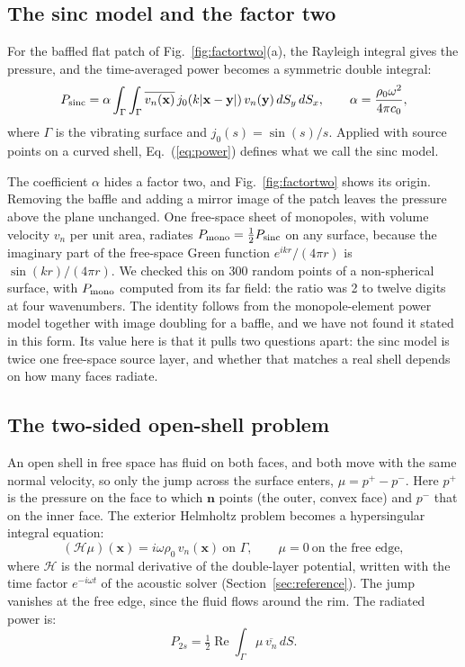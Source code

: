 \documentclass[preprint,12pt]{elsarticle}
\begin{document}
\subsection{The sinc model and the factor two}
\label{sec:sinc}
For the baffled flat patch of Fig.~\ref{fig:factortwo}(a), the Rayleigh integral gives the pressure, and the time-averaged power becomes a symmetric double integral:
\begin{equation}
 P_{\rm sinc}=\alpha\int_\Gamma\int_\Gamma \overline{v_n(\mathbf x)}\,
 j_0(k|\mathbf x-\mathbf y|)\,v_n(\mathbf y)\,dS_y\, dS_x,
 \qquad \alpha=\frac{\rho_0\omega^2}{4\pi c_0},
 \label{eq:power}
\end{equation}
where $\Gamma$ is the vibrating surface and $j_0(s)=\sin(s)/s$. Applied with source points on a curved shell, Eq.~(\ref{eq:power}) defines what we call the sinc model.

The coefficient $\alpha$ hides a factor two, and Fig.~\ref{fig:factortwo} shows its origin. Removing the baffle and adding a mirror image of the patch leaves the pressure above the plane unchanged. One free-space sheet of monopoles, with volume velocity $v_n$ per unit area, radiates $P_{\rm mono}=\tfrac12P_{\rm sinc}$ on any surface, because the imaginary part of the free-space Green function $e^{ikr}/(4\pi r)$ is $\sin(kr)/(4\pi r)$. We checked this on 300 random points of a non-spherical surface, with $P_{\rm mono}$ computed from its far field: the ratio was 2 to twelve digits at four wavenumbers. %
The identity follows from the monopole-element power model \cite{FahnlineKoopmann1996} together with image doubling for a baffle, and we have not found it stated in this form. Its value here is that it pulls two questions apart: the sinc model is twice one free-space source layer, and whether that matches a real shell depends on how many faces radiate.

\subsection{The two-sided open-shell problem}
\label{sec:twosided}
An open shell in free space has fluid on both faces, and both move with the same normal velocity, so only the jump across the surface enters, $\mu=p^+-p^-$. Here $p^+$ is the pressure on the face to which $\mathbf n$ points (the outer, convex face) and $p^-$ that on the inner face. The exterior Helmholtz problem becomes a hypersingular integral equation:
\begin{equation}
 (\mathcal H\mu)(\mathbf x)=i\omega\rho_0\,v_n(\mathbf x)\ \text{on }\Gamma,\qquad \mu=0\ \text{on the free edge},
 \label{eq:hypersingular}
\end{equation}
where $\mathcal H$ is the normal derivative of the double-layer potential, written with the time factor $e^{-i\omega t}$ of the acoustic solver (Section~\ref{sec:reference}). The jump vanishes at the free edge, since the fluid flows around the rim. The radiated power is:
\begin{equation}
 P_{2s}=\tfrac12\operatorname{Re}\int_\Gamma \mu\,\overline{v_n}\,dS .
 \label{eq:p2s}
\end{equation}
\end{document}
